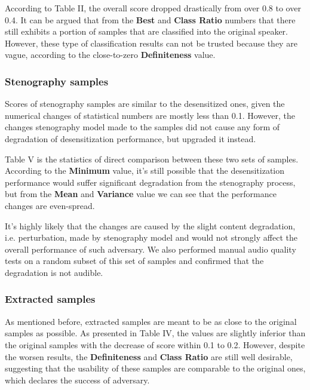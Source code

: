 \documentclass[journal]{IEEEtran} %
\begin{document}
\begin{CJK*}{UTF8}{gbsn}
According to Table II, the overall score dropped drastically from over 0.8 to over 0.4. It can be argued that from the \textbf{Best} and \textbf{Class Ratio} numbers that there still exhibits a portion of samples that are classified into the original speaker. However, these type of classification results can not be trusted because they are vague, according to the close-to-zero \textbf{Definiteness} value.

\subsubsection{Stenography samples}

Scores of stenography samples are similar to the desensitized ones, given the numerical changes of statistical numbers are mostly less than 0.1. However, the changes stenography model made to the samples did not cause any form of degradation of desensitization performance, but upgraded it instead.

Table V is the statistics of direct comparison between these two sets of samples. According to the \textbf{Minimum} value, it's still possible that the desensitization performance would suffer significant degradation from the stenography process, but from the \textbf{Mean} and \textbf{Variance} value we can see that the performance changes are even-spread.

It's highly likely that the changes are caused by the slight content degradation, i.e. perturbation, made by stenography model and would not strongly affect the overall performance of such adversary. We also performed manual audio quality tests on a random subset of this set of samples and confirmed that the degradation is not audible.

\subsubsection{Extracted samples}

As mentioned before, extracted samples are meant to be as close to the original samples as possible. As presented in Table IV, the values are slightly inferior than the original samples with the decrease of score within 0.1 to 0.2. However, despite the worsen results, the \textbf{Definiteness} and \textbf{Class Ratio} are still well desirable, suggesting that the usability of these samples are comparable to the original ones, which declares the success of adversary.


\end{CJK*}
\end{document}
